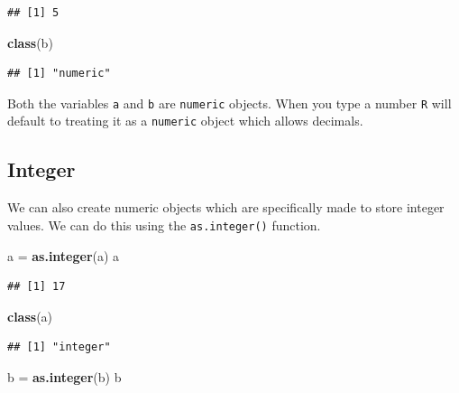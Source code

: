 \documentclass[
]{book}
\newenvironment{Shaded}{\begin{snugshade}}{\end{snugshade}}
\newcommand{\KeywordTok}[1]{\textcolor[rgb]{0.13,0.29,0.53}{\textbf{#1}}}
\newcommand{\NormalTok}[1]{#1}
\newcommand{\StringTok}[1]{\textcolor[rgb]{0.31,0.60,0.02}{#1}}
\begin{document}
\begin{verbatim}
## [1] 5
\end{verbatim}

\begin{Shaded}
\begin{Highlighting}[]
\KeywordTok{class}\NormalTok{(b)}
\end{Highlighting}
\end{Shaded}

\begin{verbatim}
## [1] "numeric"
\end{verbatim}

Both the variables \texttt{a} and \texttt{b} are \texttt{numeric} objects. When you type a number \texttt{R} will default to treating it as a \texttt{numeric} object which allows decimals.

\hypertarget{integer}{%
\subsection*{Integer}\label{integer}}

We can also create numeric objects which are specifically made to store integer values. We can do this using the \texttt{as.integer()} function.

\begin{Shaded}
\begin{Highlighting}[]
\NormalTok{a =}\StringTok{ }\KeywordTok{as.integer}\NormalTok{(a)}
\NormalTok{a}
\end{Highlighting}
\end{Shaded}

\begin{verbatim}
## [1] 17
\end{verbatim}

\begin{Shaded}
\begin{Highlighting}[]
\KeywordTok{class}\NormalTok{(a)}
\end{Highlighting}
\end{Shaded}

\begin{verbatim}
## [1] "integer"
\end{verbatim}

\begin{Shaded}
\begin{Highlighting}[]
\NormalTok{b =}\StringTok{ }\KeywordTok{as.integer}\NormalTok{(b)}
\NormalTok{b }
\end{Highlighting}
\end{Shaded}
\end{document}
